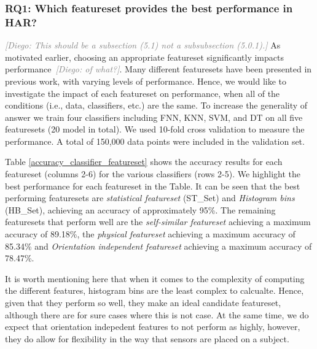 \documentclass[journal,article,submit,moreauthors,pdftex]{Definitions/mdpi}
\newcommand{\diego}[1]{\textcolor{gray}{{\it [Diego: #1]}}}
\begin{document}
\subsubsection{RQ1: Which featureset provides the best performance in HAR?}

\diego{This should be a subsection (5.1) not a subsubsection (5.0.1).}
As motivated earlier, choosing an appropriate featureset significantly impacts performance~\diego{of what?}. Many different featuresets have been presented in previous work, with varying levels of performance. Hence, we would like to investigate the impact of each featureset on performance, when all of the conditions (i.e., data, classifiers, etc.) are the same. To increase the generality of answer we train four classifiers including FNN, KNN, SVM, and DT on all five featuresets (20 model in total). We used 10-fold cross validation to measure the performance. A total of 150,000 data points were included in the validation set. 

Table \ref{accuracy_classifier_featureset} shows the accuracy results for each featureset (columns 2-6) for the various classifiers (rows 2-5). We highlight the best performance for each featureset in the Table. It can be seen that the best performing featuresets are \textit{statistical featureset} (ST\_Set) and \textit{Histogram bins} (HB\_Set), achieving an accuracy of approximately 95\%. The remaining featuresets that perform well are the \textit{self-similar featureset} achieving a maximum accuracy of 89.18\%, the \textit{physical featureset} achieving a maximum accuracy of 85.34\% and \textit{Orientation independent featureset} achieving a maximum accuracy of 78.47\%.

It is worth mentioning here that when it comes to the complexity of computing the different features, histogram bins are the least complex to calcualte. Hence, given that they perform so well, they make an ideal candidate featureset, although there are for sure cases where this is not case. At the same time, we do expect that orientation indepedent features to not perform as highly, however, they do allow for flexibility in the way that sensors are placed on a subject.
\end{document}
